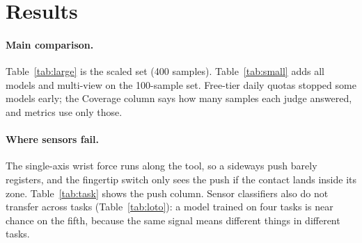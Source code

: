 \documentclass[10pt,twocolumn]{article}
\begin{document}
\section{Results}
\paragraph{Main comparison.} Table~\ref{tab:large} is the scaled set (400 samples). Table~\ref{tab:small} adds all models and multi-view on the 100-sample set. Free-tier daily quotas stopped some models early; the Coverage column says how many samples each judge answered, and metrics use only those.
\begin{table}[t]\centering\small\caption{Scaled set (400 samples). Sorted by balanced accuracy.}\label{tab:large}\end{table}
\begin{table}[t]\centering\small\resizebox{\columnwidth}{!}{}\caption{Paired McNemar test of each VLM against the sensor classifier on the samples the VLM answered (scaled set).}\label{tab:mcnemar}\end{table}
\begin{table}[t]\centering\small\caption{Small set (100 samples), all judges including multi-view. Partial coverage reflects free-tier quotas.}\label{tab:small}\end{table}
\begin{table}[t]\centering\small\resizebox{\columnwidth}{!}{}\caption{Balanced accuracy by task, scaled set.}\label{tab:task}\end{table}


\paragraph{Where sensors fail.} The single-axis wrist force runs along the tool, so a sideways push barely registers, and the fingertip switch only sees the push if the contact lands inside its zone. Table~\ref{tab:task} shows the push column. Sensor classifiers also do not transfer across tasks (Table~\ref{tab:loto}): a model trained on four tasks is near chance on the fifth, because the same signal means different things in different tasks.
\begin{table}[t]\centering\small\caption{Sensor classifier trained on four tasks, tested on the held-out one.}\label{tab:loto}\end{table}
\end{document}
